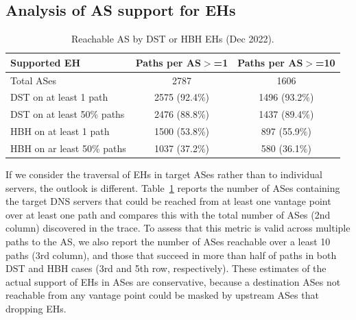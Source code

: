 \documentclass[conference]{IEEEtran}
\begin{document}
\subsection{Analysis of AS support for EHs}

\begin{table}
\caption{Reachable AS by DST or HBH EHs (Dec 2022).}
\begin{tabular}{l|c|c}
Supported EH                & Paths per AS$>$=1 & Paths per AS$>$=10 \\
\hline \hline
Total  ASes                 & 2787              & 1606 \\
\hline
DST on at least 1 path      & 2575 (92.4\%)     & 1496 (93.2\%)      \\
DST on at least 50\% paths  & 2476 (88.8\%)     & 1437 (89.4\%)      \\ \hline
HBH on at least 1 path      & 1500 (53.8\%)      & 897 (55.9\%)      \\
HBH on ar least 50\% paths  & 1037 (37.2\%)      & 580 (36.1\%)  
\end{tabular}
\label{tbl:as_pathspider}
\end{table}

If we consider the traversal of EHs in target ASes rather than to individual
servers, the outlook is different.  Table~\ref{tbl:as_pathspider} reports the
number of ASes containing the target DNS servers that could be reached from at
least one vantage point over at least one path and compares this with the total
number of ASes (2nd column) discovered in the trace. To assess that this
metric is valid across multiple paths to the AS, we also report the number of
ASes reachable over a least 10 paths (3rd column), and those that succeed in more
than half of paths in both DST and HBH cases (3rd and 5th row, respectively).
These estimates of the actual support of EHs in ASes
are conservative, because a destination ASes not reachable from any
vantage point could be masked by upstream ASes that dropping EHs.


\end{document}

